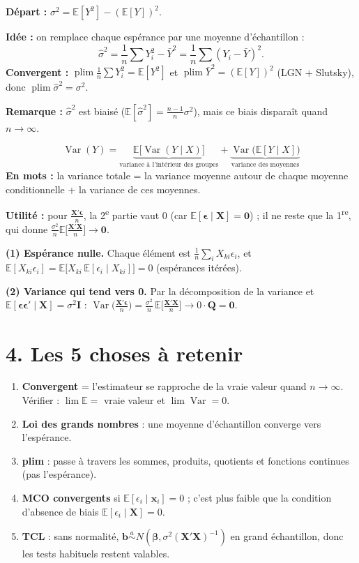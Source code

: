 \documentclass[12pt,a4paper]{article}
\newcommand{\vX}{\mathbf{X}}\newcommand{\vb}{\mathbf{b}}\newcommand{\vx}{\mathbf{x}}
\newcommand{\vbeta}{\bm{\beta}}\newcommand{\veps}{\bm{\epsilon}}\newcommand{\Q}{\mathbf{Q}}\newcommand{\I}{\mathbf{I}}
\newcommand{\E}{\mathbb{E}}\newcommand{\Var}{\operatorname{Var}}\newcommand{\plim}{\operatorname{plim}}
\begin{document}
\begin{dev}[title={Estimer $\sigma^2$ avec la loi des grands nombres}]
\textbf{Départ :} $\sigma^2=\E[Y^2]-(\E[Y])^2$.

\textbf{Idée :} on remplace chaque espérance par une moyenne d'échantillon :
\[
\hat\sigma^2=\frac1n\sum Y_i^2-\bar Y^2=\frac1n\sum(Y_i-\bar Y)^2 .
\]
\textbf{Convergent :} $\plim\frac1n\sum Y_i^2=\E[Y^2]$ et $\plim\bar Y^2=(\E[Y])^2$ (LGN + Slutsky), donc $\plim\hat\sigma^2=\sigma^2$.

\textbf{Remarque :} $\hat\sigma^2$ est biaisé ($\E[\hat\sigma^2]=\frac{n-1}{n}\sigma^2$), mais ce biais disparaît quand $n\to\infty$.
\end{dev}

\begin{dev}[title={La décomposition de la variance}]
\[
\Var(Y)=\underbrace{\E\big[\Var(Y\mid X)\big]}_{\text{variance à l'intérieur des groupes}}+\underbrace{\Var\big(\E[Y\mid X]\big)}_{\text{variance des moyennes}}
\]
\textbf{En mots :} la variance totale = la variance moyenne autour de chaque moyenne conditionnelle + la variance de ces moyennes.

\textbf{Utilité :} pour $\frac{\vX'\veps}{n}$, la 2\textsuperscript{e} partie vaut 0 (car $\E[\veps\mid\vX]=\mathbf 0$) ; il ne reste que la 1\textsuperscript{re}, qui donne $\frac{\sigma^2}{n}\E\big[\frac{\vX'\vX}{n}\big]\to\mathbf 0$.
\end{dev}

\begin{dev}[title={Pourquoi $\plim\frac{\vX'\veps}{n}=\mathbf 0$ (les deux conditions)}]
\textbf{(1) Espérance nulle.} Chaque élément est $\frac1n\sum_iX_{ki}\epsilon_i$, et $\E[X_{ki}\epsilon_i]=\E\big[X_{ki}\,\E[\epsilon_i\mid X_{ki}]\big]=0$ (espérances itérées).

\textbf{(2) Variance qui tend vers 0.} Par la décomposition de la variance et $\E[\veps\veps'\mid\vX]=\sigma^2\I$ :
$\Var\big(\frac{\vX'\veps}{n}\big)=\frac{\sigma^2}{n}\,\E\big[\frac{\vX'\vX}{n}\big]\to0\cdot\Q=\mathbf 0$.
\end{dev}

\section*{4. Les 5 choses à retenir}
\begin{enumerate}[itemsep=4pt]
\item \textbf{Convergent} = l'estimateur se rapproche de la vraie valeur quand $n\to\infty$. Vérifier : $\lim\E=$ vraie valeur et $\lim\Var=0$.
\item \textbf{Loi des grands nombres} : une moyenne d'échantillon converge vers l'espérance.
\item \textbf{plim} : passe à travers les sommes, produits, quotients et fonctions continues (pas l'espérance).
\item \textbf{MCO convergents} si $\E[\epsilon_i\mid\vx_i]=0$ ; c'est plus faible que la condition d'absence de biais $\E[\epsilon_i\mid\vX]=0$.
\item \textbf{TCL} : sans normalité, $\vb\overset{a}{\sim}N(\vbeta,\sigma^2(\vX'\vX)^{-1})$ en grand échantillon, donc les tests habituels restent valables.
\end{enumerate}
\end{document}
